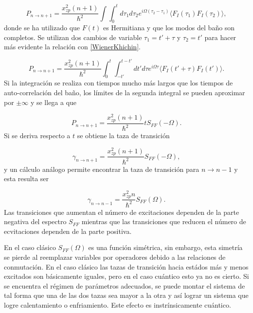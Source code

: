 \documentclass[10pt,a4paper]{report}
\begin{document}
\begin{equation}
P_{n \to n+1} = \frac{x_{zp}^2 (n+1)}{\hbar^2} \int\int_0^t d\tau_1 d\tau_2 e^{i \Omega (\tau_2-\tau_1)}\langle F_I(\tau_1)F_I(\tau_2) \rangle ,
\end{equation} donde se ha utilizado que $F(t)$ es Hermitiana y que los modos del baño son completos. Se utilizan dos cambios de variable $\tau_1 = t' + \tau$ y $\tau_2 = t'$ para hacer más evidente la relación con \eqref{WienerKhichin}.

\begin{equation}
P_{n \to n+1} = \frac{x_{zp}^2 (n+1)}{\hbar^2} \int_0^t \int_{-t'}^{t-t'} dt' d\tau e^{i \Omega \tau}\langle F_I(t'+\tau)F_I(t') \rangle.
\end{equation} Si la integración se realiza con tiempos mucho más largos que los tiempos de auto-correlación del baño, los límites de la segunda integral se pueden aproximar por $\pm \infty$ y se llega a que

\begin{equation}
P_{n \to n+1} = \frac{x_{zp}^2 (n+1)}{\hbar^2} t S_{FF}(-\Omega).
\end{equation} Si se deriva respecto a $t$ se obtiene la taza de transición

\begin{equation}
\gamma_{n \to n+1} = \frac{x_{zp}^2 (n+1)}{\hbar^2}  S_{FF}(-\Omega),
\end{equation} y un cálculo análogo permite encontrar la taza de transición para $n \to n-1$ y esta resulta ser

\begin{equation}
\gamma_{n \to n-1} = \frac{x_{zp}^2 n}{\hbar^2} S_{FF}(\Omega).
\end{equation} Las transiciones que aumentan el número de excitaciones dependen de la parte negativa del espectro $S_{FF}$ mientras que las transiciones que reducen el número de ecvitaciones dependen de la parte positiva.

En el caso clásico $S_{FF}(\Omega)$ es una función simétrica, sin embargo, esta simetría se pierde al reemplazar variables por operadores debido a las relaciones de conmutación. En el caso clásico las tazas de transición hacia estádos más y menos excitados son básicamente iguales, pero en el caso cuántico esto ya no es cierto. Si se encuentra el régimen de parámetros adecuados, se puede montar el sistema de tal forma que una de las dos tazas sea mayor a la otra y así lograr un sistema que logre calentamiento o enfriamiento. Este efecto es instrínsicamente cuántico. 
 
\end{document}
